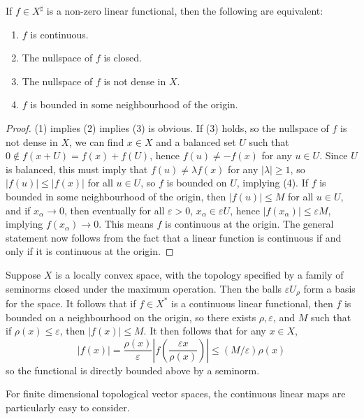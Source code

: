 \begin{theorem}
    If $f \in X^\sharp$ is a non-zero linear functional, then the following are equivalent:
    \begin{enumerate}
        \item $f$ is continuous.
        \item The nullspace of $f$ is closed.
        \item The nullspace of $f$ is not dense in $X$.
        \item $f$ is bounded in some neighbourhood of the origin.
    \end{enumerate}
\end{theorem}
\begin{proof}
    (1) implies (2) implies (3) is obvious. If (3) holds, so the nullspace of $f$ is not dense in $X$, we can find $x \in X$ and a balanced set $U$ such that $0 \not \in f(x + U) = f(x) + f(U)$, hence $f(u) \neq - f(x)$ for any $u \in U$. Since $U$ is balanced, this must imply that $f(u) \neq \lambda f(x)$ for any $|\lambda| \geq 1$, so $|f(u)| \leq |f(x)|$ for all $u \in U$, so $f$ is bounded on $U$, implying (4). If $f$ is bounded in some neighbourhood of the origin, then $|f(u)| \leq M$ for all $u \in U$, and if $x_\alpha \to 0$, then eventually for all $\varepsilon > 0$, $x_\alpha \in \varepsilon U$, hence $|f(x_\alpha)| \leq \varepsilon M$, implying $f(x_\alpha) \to 0$. This means $f$ is continuous at the origin. The general statement now follows from the fact that a linear function is continuous if and only if it is continuous at the origin.
\end{proof}

\begin{example}
    Suppose $X$ is a locally convex space, with the topology specified by a family of seminorms closed under the maximum operation. Then the balls $\varepsilon U_\rho$ form a basis for the space. It follows that if $f \in X^*$ is a continuous linear functional, then $f$ is bounded on a neighbourhood on the origin, so there exists $\rho, \varepsilon$, and $M$ such that if $\rho(x) \leq \varepsilon$, then $|f(x)| \leq M$. It then follows that for any $x \in X$,
    \[ |f(x)| = \frac{\rho(x)}{\varepsilon} \left| f \left( \frac{\varepsilon x}{\rho(x)} \right) \right| \leq (M/\varepsilon) \rho(x) \]
    so the functional is directly bounded above by a seminorm.
\end{example}

For finite dimensional topological vector spaces, the continuous linear maps are particularly easy to consider.

